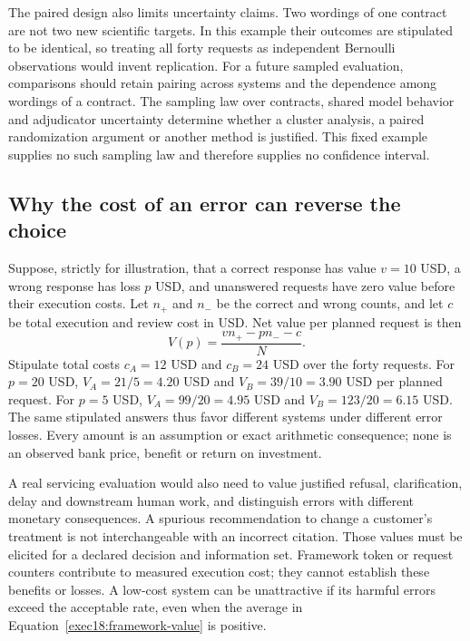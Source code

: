 The paired design also limits uncertainty claims. Two wordings of one
contract are not two new scientific targets. In this example their outcomes
are stipulated to be identical, so treating all forty requests as
independent Bernoulli observations would invent replication. For a future
sampled evaluation, comparisons should retain pairing across systems and
the dependence among wordings of a contract. The sampling law over
contracts, shared model behavior and adjudicator uncertainty determine
whether a cluster analysis, a paired randomization argument or another
method is justified. This fixed example supplies no such sampling law and
therefore supplies no confidence interval.

\subsection{Why the cost of an error can reverse the choice}

Suppose, strictly for illustration, that a correct response has value
$v=10$ USD, a wrong response has loss $p$ USD, and unanswered requests have
zero value before their execution costs. Let $n_{+}$ and $n_{-}$ be the
correct and wrong counts, and let $c$ be total execution and review cost in
USD. Net value per planned request is then
\begin{equation}
 V(p)=\frac{v n_{+}-p n_{-}-c}{N}.
 \label{exec18:framework-value}
\end{equation}
Stipulate total costs $c_A=12$ USD and $c_B=24$ USD over the forty requests.
For $p=20$ USD, $V_A=21/5=4.20$ USD and
$V_B=39/10=3.90$ USD per planned request. For $p=5$ USD,
$V_A=99/20=4.95$ USD and $V_B=123/20=6.15$ USD.
The same stipulated answers thus favor different systems under different
error losses. Every amount is an assumption or exact arithmetic consequence;
none is an observed bank price, benefit or return on investment.
\citep{exec18_framework_reference}

A real servicing evaluation would also need to value justified refusal,
clarification, delay and downstream human work, and distinguish errors
with different monetary consequences. A spurious recommendation to change
a customer's treatment is not interchangeable with an incorrect citation.
Those values must be elicited for a declared decision and information set.
Framework token or request counters contribute to measured execution cost;
they cannot establish these benefits or losses. A low-cost system can be
unattractive if its harmful errors exceed the acceptable rate, even when
the average in Equation~\ref{exec18:framework-value} is positive.

